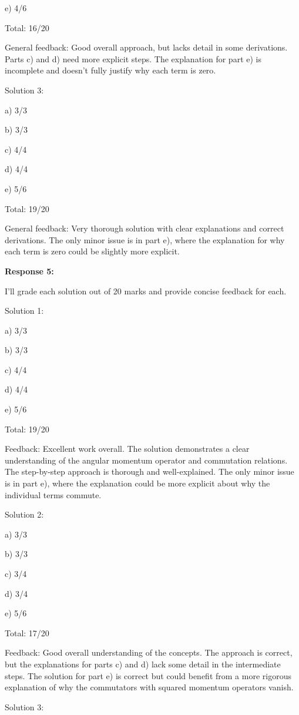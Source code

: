 \documentclass[a4paper,11pt]{article}
\begin{document}
e) 4/6

Total: 16/20

General feedback: Good overall approach, but lacks detail in some derivations. Parts c) and d) need more explicit steps. The explanation for part e) is incomplete and doesn't fully justify why each term is zero.

Solution 3:

a) 3/3

b) 3/3

c) 4/4

d) 4/4

e) 5/6

Total: 19/20

General feedback: Very thorough solution with clear explanations and correct derivations. The only minor issue is in part e), where the explanation for why each term is zero could be slightly more explicit.

\bigskip   
\textbf{Response 5:}

I'll grade each solution out of 20 marks and provide concise feedback for each.

Solution 1:

a) 3/3

b) 3/3

c) 4/4

d) 4/4

e) 5/6

Total: 19/20

Feedback: Excellent work overall. The solution demonstrates a clear understanding of the angular momentum operator and commutation relations. The step-by-step approach is thorough and well-explained. The only minor issue is in part e), where the explanation could be more explicit about why the individual terms commute.

Solution 2:

a) 3/3

b) 3/3

c) 3/4

d) 3/4

e) 5/6

Total: 17/20

Feedback: Good overall understanding of the concepts. The approach is correct, but the explanations for parts c) and d) lack some detail in the intermediate steps. The solution for part e) is correct but could benefit from a more rigorous explanation of why the commutators with squared momentum operators vanish.

Solution 3:
\end{document}

